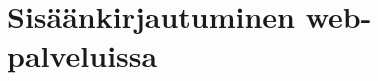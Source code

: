 \documentclass[finnish,gradu]{tktltiki}
\begin{document}





\newpage
\section{Sisäänkirjautuminen web-palveluissa} %
\label{sec:autentikoituminen_ja_web}
\end{document}
